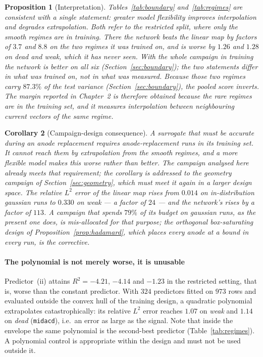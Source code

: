 \documentclass[11pt,a4paper]{article}
\theoremstyle{plain}
\newtheorem{proposition}{Proposition}
\newtheorem{corollary}[proposition]{Corollary}
\theoremstyle{definition}
\theoremstyle{remark}
\begin{document}
\begin{proposition}[Interpretation]
\label{prop:interp}
Tables~\ref{tab:boundary} and~\ref{tab:regimes} are consistent with a single
statement: greater model flexibility improves interpolation and degrades
extrapolation. Both refer to the \emph{restricted} split, where only the smooth
regimes are in training. There the network beats the linear map by factors of
$3.7$ and $8.8$ on the two regimes it was trained on, and is \emph{worse} by
$1.26$ and $1.28$ on \textit{dead} and \textit{weak}, which it has never seen.
With the whole campaign in training the network is better on all six
(Section~\ref{sec:boundary}); the two statements differ in what was trained on,
not in what was measured. Because those two
regimes carry $87.3\%$ of the test variance
(Section~\ref{sec:boundary}), the pooled score inverts. The margin
reported in Chapter~2 is therefore obtained because the rare regimes are
\emph{in the training set}, and it measures interpolation between neighbouring
current vectors of the same regime.
\end{proposition}

\begin{corollary}[Campaign-design consequence]
\label{cor:campaign}
A surrogate that must be accurate during an anode replacement requires
anode-replacement runs in its training set. It cannot reach them by
extrapolation from the smooth regimes, and a more flexible model makes this
worse rather than better. The campaign analysed here already meets that
requirement; the corollary is addressed to the geometry campaign of
Section~\ref{sec:geometry}, which must meet it again in a larger design
space. The
relative $L^2$ error of the linear map rises from $0.014$ on in-distribution
\textit{gaussian} runs to $0.330$ on \textit{weak} --- a factor of $24$ --- and
the network's rises by a factor of $113$. A campaign that spends $79\%$ of its
budget on \textit{gaussian} runs, as the present one does, is mis-allocated for
that purpose; the orthogonal box-saturating design of
Proposition~\ref{prop:hadamard}, which places every anode at a bound in every
run, is the corrective.
\end{corollary}

\paragraph{The polynomial is not merely worse, it is unusable}
Predictor~(ii) attains $R^2 = -4.21$, $-4.14$ and $-1.23$ in the restricted
setting, that is, worse than the constant predictor. With $324$ predictors
fitted on $973$ rows and evaluated outside the convex hull of the training
design, a quadratic polynomial extrapolates catastrophically: its relative $L^2$
error reaches $1.07$ on \textit{weak} and $1.14$ on \textit{dead}
(\texttt{midacd}), i.e.\ an error as large as the signal. Note that inside the
envelope the same polynomial is the second-best predictor
(Table~\ref{tab:regimes}). A polynomial control is appropriate within the design
and must not be used outside it.
\end{document}
